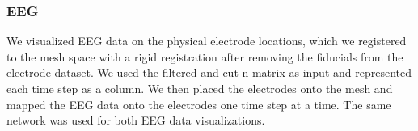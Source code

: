 \subsubsection{EEG}

We visualized EEG data on the physical electrode locations, which we registered to the mesh space with a rigid registration after removing the fiducials from the electrode dataset. We used the filtered and cut n matrix as input and represented each time step as a column. We then placed the electrodes onto the mesh and mapped the EEG data onto the electrodes one time step at a time. The same network was used for both EEG data visualizations.